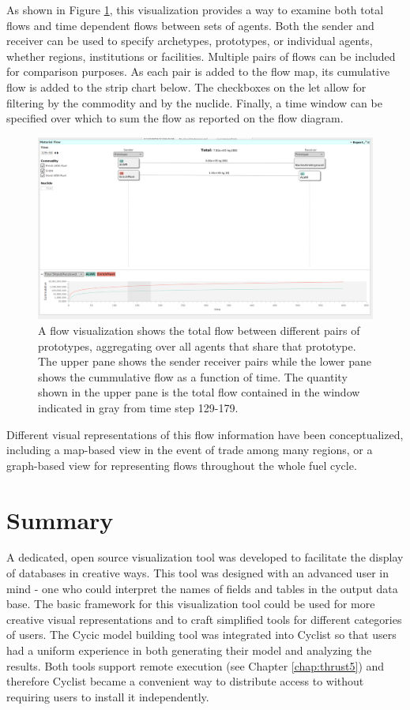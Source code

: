 As shown in Figure \ref{fig:flow-01-05}, this visualization provides a way to
examine both total flows and time dependent flows between sets of agents.
Both the sender and receiver can be used to specify archetypes, prototypes, or
individual agents, whether regions, institutions or facilities.  Multiple
pairs of flows can be included for comparison purposes.  As each pair is added
to the flow map, its cumulative flow is added to the strip chart below.  The
checkboxes on the let allow for filtering by the commodity and by the nuclide.
Finally, a time window can be specified over which to sum the flow as reported
on the flow diagram.

\begin{figure}[htbp]
  \centering
  \includegraphics[width=\columnwidth]{./images/flow-01-05}
  \caption{A flow visualization shows the total flow between different pairs of
    prototypes, aggregating over all agents that share that prototype.  The
    upper pane shows the sender receiver pairs while the lower pane shows the
    cummulative flow as a function of time.  The quantity shown in the upper
    pane is the total flow contained in the window indicated in gray from time
    step 129-179. }
  \label{fig:flow-01-05}
\end{figure}

Different visual representations of this flow information have been
conceptualized, including a map-based view in the event of trade among many
regions, or a graph-based view for representing flows throughout the whole
fuel cycle.

\section{Summary}

A dedicated, open source visualization tool was developed to facilitate the
display of \Cyclus databases in creative ways.  This tool was designed with an
advanced user in mind - one who could interpret the names of fields and tables
in the output data base.  The basic framework for this visualization tool
could be used for more creative visual representations and to craft simplified
tools for different categories of users.  The Cycic model building tool was
integrated into Cyclist so that users had a uniform experience in both
generating their model and analyzing the results.  Both tools support remote
execution (see Chapter \ref{chap:thrust5}) and therefore Cyclist became a
convenient way to distribute access to \Cyclus without requiring users to
install it independently.

